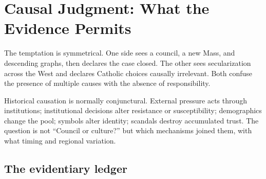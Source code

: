 \section{Causal Judgment: What the Evidence Permits}

The temptation is symmetrical. One side sees a council, a new Mass, and descending graphs, then declares the case closed. The other sees secularization across the West and declares Catholic choices causally irrelevant. Both confuse the presence of multiple causes with the absence of responsibility.

Historical causation is normally conjunctural. External pressure acts through institutions; institutional decisions alter resistance or susceptibility; demographics change the pool; symbols alter identity; scandals destroy accumulated trust. The question is not “Council or culture?” but which mechanisms joined them, with what timing and regional variation.

\subsection{The evidentiary ledger}

